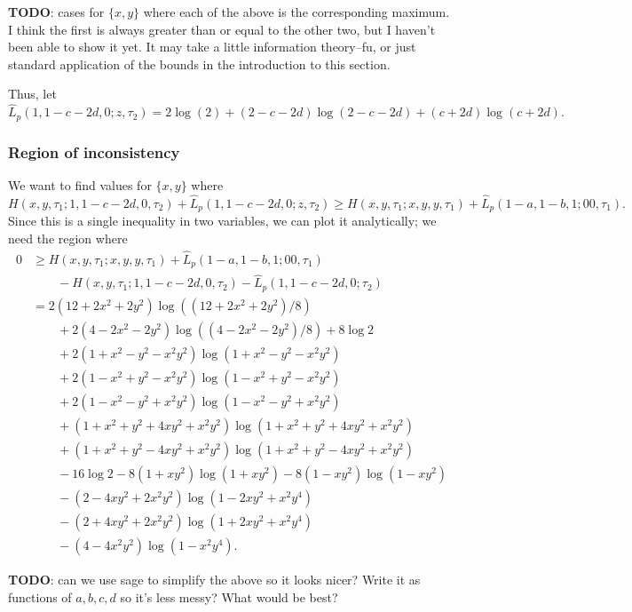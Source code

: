 \documentclass[a4paper]{article}
\begin{document}
\textbf{TODO}: cases for $\{x, y\}$ where each of the above is the corresponding maximum.
I think the first is always greater than or equal to the other two, but I haven't been able to show it yet.
It may take a little information theory--fu, or just standard application of the bounds in the introduction to this section.

Thus, let
$$
\hat{L}_{p}(1,1-c-2d,0;z,\tau_2) = 2\log(2)+(2-c-2d)\log(2-c-2d)+(c+2d)\log(c+2d).
$$

\subsubsection{Region of inconsistency}

We want to find values for $\{x,y\}$ where
$$
H(x,y,\tau_1; 1, 1-c-2d, 0, \tau_2) + \hat{L}_{p}(1,1-c-2d,0;z,\tau_2) \ge H(x,y,\tau_1; x, y, y,\tau_1) + \hat{L}_{p}(1-a,1-b,1;00,\tau_1).
$$
Since this is a single inequality in two variables, we can plot it analytically; we need the region where
\begin{align*}
    0 &\ge H(x,y,\tau_1; x, y, y,\tau_1) + \hat{L}_{p}(1-a,1-b,1;00,\tau_1) \\
      &\qquad - H(x,y,\tau_1; 1, 1-c-2d, 0, \tau_2) - \hat{L}_{p}(1,1-c-2d,0;\tau_2) \\
      & = 2(12+2x^2+2y^2)\log((12+2x^2+2y^2)/8) \\
      &\qquad + 2(4-2x^2-2y^2)\log((4-2x^2-2y^2)/8)  + 8\log2 \\
      &\qquad + 2(1+x^2-y^2-x^2y^2)\log(1+x^2-y^2-x^2y^2) \\
      &\qquad + 2(1-x^2+y^2-x^2y^2)\log(1-x^2+y^2-x^2y^2) \\
      &\qquad + 2(1-x^2-y^2+x^2y^2)\log(1-x^2-y^2+x^2y^2) \\
      &\qquad + (1+x^2+y^2+4xy^2+x^2y^2)\log(1+x^2+y^2+4xy^2+x^2y^2) \\
      &\qquad + (1+x^2+y^2-4xy^2+x^2y^2)\log(1+x^2+y^2-4xy^2+x^2y^2) \\
      &\qquad - 16\log2 - 8(1+xy^2)\log(1+xy^2) - 8(1-xy^2)\log(1-xy^2) \\
      &\qquad - (2-4xy^2+2x^2y^2)\log(1-2xy^2+x^2y^4) \\
      &\qquad - (2+4xy^2+2x^2y^2)\log(1+2xy^2+x^2y^4) \\
      &\qquad - (4-4x^2y^2)\log(1-x^2y^4).
\end{align*}

\textbf{TODO}: can we use sage to simplify the above so it looks nicer?
Write it as functions of $a,b,c,d$ so it's less messy?
What would be best?
\end{document}
